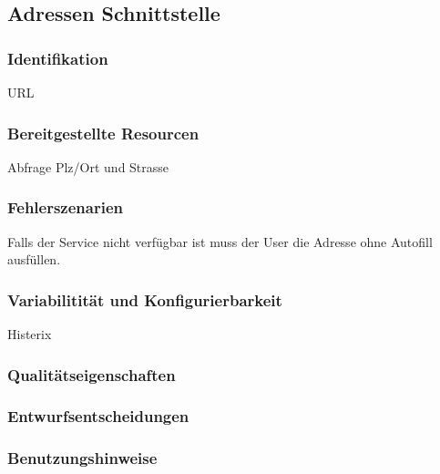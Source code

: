 \subsection{Adressen Schnittstelle}

\subsubsection{Identifikation}
URL

\subsubsection{Bereitgestellte Resourcen}
Abfrage Plz/Ort und Strasse

\subsubsection{Fehlerszenarien}
Falls der Service nicht verfügbar ist muss der User die Adresse ohne Autofill ausfüllen.

\subsubsection{Variabilitität und Konfigurierbarkeit}
Histerix

\subsubsection{Qualitätseigenschaften}

\subsubsection{Entwurfsentscheidungen} 

\subsubsection{Benutzungshinweise} 


